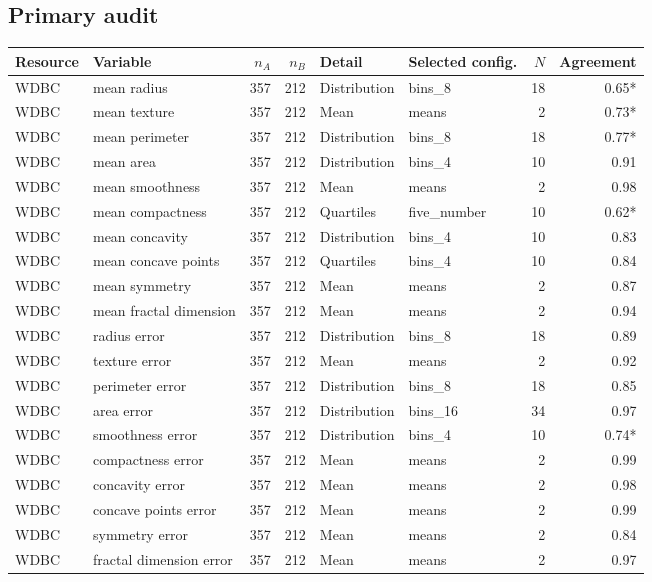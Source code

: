 \subsection*{Primary audit}
\small
\begin{longtable}{p{1.95cm}p{4.25cm}rrp{1.7cm}p{2.1cm}rr}
\toprule Resource & Variable & $n_A$ & $n_B$ & Detail & Selected config. & $N$ & Agreement\\\midrule\endhead
WDBC & mean radius & 357 & 212 & Distribution & bins\_8 & 18 & 0.65*\\
WDBC & mean texture & 357 & 212 & Mean & means & 2 & 0.73*\\
WDBC & mean perimeter & 357 & 212 & Distribution & bins\_8 & 18 & 0.77*\\
WDBC & mean area & 357 & 212 & Distribution & bins\_4 & 10 & 0.91\\
WDBC & mean smoothness & 357 & 212 & Mean & means & 2 & 0.98\\
WDBC & mean compactness & 357 & 212 & Quartiles & five\_number & 10 & 0.62*\\
WDBC & mean concavity & 357 & 212 & Distribution & bins\_4 & 10 & 0.83\\
WDBC & mean concave points & 357 & 212 & Quartiles & bins\_4 & 10 & 0.84\\
WDBC & mean symmetry & 357 & 212 & Mean & means & 2 & 0.87\\
WDBC & mean fractal dimension & 357 & 212 & Mean & means & 2 & 0.94\\
WDBC & radius error & 357 & 212 & Distribution & bins\_8 & 18 & 0.89\\
WDBC & texture error & 357 & 212 & Mean & means & 2 & 0.92\\
WDBC & perimeter error & 357 & 212 & Distribution & bins\_8 & 18 & 0.85\\
WDBC & area error & 357 & 212 & Distribution & bins\_16 & 34 & 0.97\\
WDBC & smoothness error & 357 & 212 & Distribution & bins\_4 & 10 & 0.74*\\
WDBC & compactness error & 357 & 212 & Mean & means & 2 & 0.99\\
WDBC & concavity error & 357 & 212 & Mean & means & 2 & 0.98\\
WDBC & concave points error & 357 & 212 & Mean & means & 2 & 0.99\\
WDBC & symmetry error & 357 & 212 & Mean & means & 2 & 0.84\\
WDBC & fractal dimension error & 357 & 212 & Mean & means & 2 & 0.97\\

\end{longtable}

